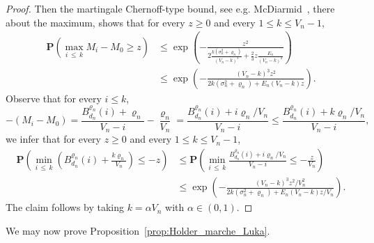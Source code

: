 \documentclass[10pt]{amsart}
\theoremstyle{definition}\newtheorem{defi}[theo]{Definition}\newtheorem{rema}[theo]{Remark}\newtheorem{exam}[theo]{Example}\newtheorem{exem}[theo]{Example}\newtheorem{nota}[theo]{Notation}
\newcommand{\ensembles}[1]{\mathbf{#1}}
\renewcommand{\P}{\ensembles{P}}
\renewcommand{\Pr}[1]{\P\left(#1\right)}
\newcommand{\1}{\ensembles{1}}
\renewcommand{\le}{\leqslant}
\renewcommand{\ge}{\geqslant}
\newcommand{\Bfn}{B_{d_n}^{\varrho_n}}
\newcommand{\edges}{E}
\newcommand{\vertices}{V}
\providecommand{\?}{}
\begin{document}
\begin{proof}
Then the martingale Chernoff-type bound, see e.g. McDiarmid~\cite[Theorem~3.15 and the remark at the end of Section~3.5]{McD98}, there about the maximum, shows that for every $z \ge 0$ and every $1 \le k \le \vertices_n-1$,
\begin{align*}
\Pr{\max_{i\,\le\,k} M_i - M_0 \ge z} &\le \exp\left(- \frac{z^2}{2 \frac{k \left(\sigma_n^2+\varrho_n\right)}{\left(\vertices_n - k\right)^3} + \frac{2}{3} z \frac{\edges_n}{\left(\vertices_n - k\right)^2}}\right)
\\
&\le \exp\left(- \frac{\left(\vertices_n - k\right)^3 z^2}{2k \left(\sigma_n^2+\varrho_n\right) + \edges_n (\vertices_n-k) z}\right).
\end{align*}
Observe that for every $i \le k$,
\[
- \left(M_i - M_0\right) = \frac{\Bfn(i) + \varrho_n}{\vertices_n-i} - \frac{\varrho_n}{\vertices_n} = \frac{\Bfn(i) + i \varrho_n / \vertices_n}{\vertices_n-i}
\le \frac{\Bfn(i) + k \varrho_n / \vertices_n}{\vertices_n-i},
\]
we infer that for every $z \ge 0$ and every $1 \le k \le \vertices_n-1$,
\begin{align*}
\Pr{\min_{i\,\le\,k} \left(\Bfn(i) + \frac{k \varrho_n}{\vertices_n}\right) \le - z} &\le \Pr{\min_{i\,\le\,k} \frac{\Bfn(i) + i \varrho_n / \vertices_n}{\vertices_n-i} \le - \frac{z}{\vertices_n}}
\\
&\le \exp\left(- \frac{\left(\vertices_n - k\right)^3 z^2 / \vertices_n^2}{2k \left(\sigma_n^2+\varrho_n\right) + \edges_n \left(\vertices_n-k\right) z / \vertices_n}\right).
\end{align*}
The claim follows by taking $k = \alpha \vertices_n$ with $\alpha \in (0,1)$.
\end{proof}



We may now prove Proposition~\ref{prop:Holder_marche_Luka}.
\end{document}
